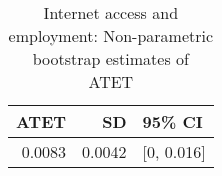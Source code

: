 \begin{table}[!h]
\centering
\caption{\label{tab:tab:np_atet}Internet access and employment: Non-parametric bootstrap estimates of ATET}
\centering
\begin{tabular}[t]{rrl}
\toprule
ATET & SD & 95\% CI\\
\midrule
0.0083 & 0.0042 & {}[0, 0.016]\\
\bottomrule
\end{tabular}
\end{table}
